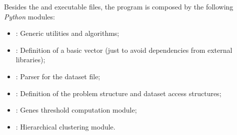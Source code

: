     Besides the  and 
    executable files, the program is composed by the following
    \emph{Python} modules:
    \begin{itemize}
    \item {}:
        Generic utilities and algorithms;
    \item {}:
        Definition of a basic vector (just to avoid dependencies from
        external libraries);
    \item {}:
        Parser for the dataset file;
    \item {}:
        Definition of the problem structure and dataset access structures;
    \item {}:
        Genes threshold computation module;
    \item {}:
        Hierarchical clustering module.
    \end{itemize}


